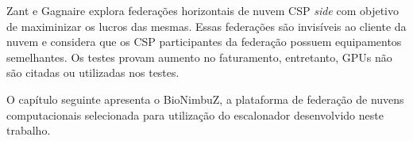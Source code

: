 Zant e Gagnaire \cite{6814036} explora federações horizontais de nuvem \acrfull{CSP} \textit{side} com objetivo de maximinizar os lucros das mesmas. Essas federações são invisíveis ao cliente da nuvem e considera que os \acrshort{CSP} participantes da federação possuem equipamentos semelhantes. Os testes provam aumento no faturamento, entretanto, \acrshort{GPU}s não são citadas ou utilizadas nos testes.


O capítulo seguinte apresenta o BioNimbuZ, a plataforma de federação de nuvens computacionais selecionada para utilização do escalonador desenvolvido neste trabalho.

